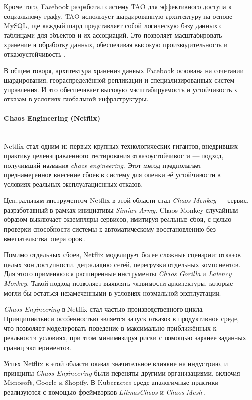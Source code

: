 Кроме того, Facebook разработал систему TAO для эффективного доступа к социальному графу. TAO использует шардированную архитектуру на основе MySQL, где каждый шард представляет собой логическую базу данных с таблицами для объектов и их ассоциаций. Это позволяет масштабировать хранение и обработку данных, обеспечивая высокую производительность и отказоустойчивость \autocite{TAODistributedGraph}.

В общем говоря, архитектура хранения данных Facebook основана на сочетании шардирования, геораспределённой репликации и специализированных систем управления. И это обеспечивает высокую масштабируемость и устойчивость к отказам в условиях глобальной инфраструктуры.

\paragraph{Chaos Engineering (Netflix)} ~\\

Netflix стал одним из первых крупных технологических гигантов, внедривших практику целенаправленного тестирования отказоустойчивости — подход, получивший название \textit{chaos engineering}. Этот метод предполагает преднамеренное внесение сбоев в систему для оценки её устойчивости в условиях реальных эксплуатационных отказов.

Центральным инструментом Netflix в этой области стал \textit{Chaos Monkey} — сервис, разработанный в рамках инициативы \textit{Simian Army}. Chaos Monkey случайным образом выключает экземпляры сервисов, имитируя реальные сбои, с целью проверки способности системы к автоматическому восстановлению без вмешательства операторов \autocite{NetflixSimianArmy}.

Помимо отдельных сбоев, Netflix моделирует более сложные сценарии: отказов целых зон доступности, деградацию сетей, перегрузки отдельных компонентов. Для этого применяются расширенные инструменты \textit{Chaos Gorilla} и \textit{Latency Monkey}. Такой подход позволяет выявлять уязвимости архитектуры, которые могли бы остаться незамеченными в условиях нормальной эксплуатации.

\textit{Chaos Engineering} в Netflix стал частью производственного цикла. Принципиальной особенностью является запуск отказов в продуктивной среде, что позволяет моделировать поведение в максимально приближённых к реальности условиях, при этом минимизируя риски с помощью заранее заданных границ экспериментов.

Успех Netflix в этой области оказал значительное влияние на индустрию, и принципы \textit{Chaos Engineering} были переняты другими организациями, включая Microsoft, Google и Shopify. В Kubernetes-среде аналогичные практики реализуются с помощью фреймворков \textit{LitmusChaos} и \textit{Chaos Mesh} \autocites{LitmusChaosIntro}{ChaosMeshDocs}.


